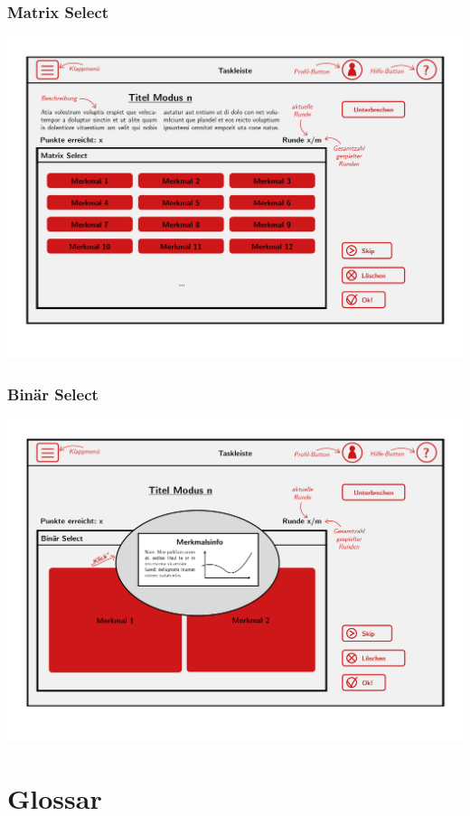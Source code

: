 \documentclass[a4paper]{scrreprt}
\begin{document}
    \subsection{Matrix Select}
    \centering
    \includegraphics[width=\textwidth]{../pictures/MatrixSelect.jpg}
    \subsection{Binär Select}
    \centering
    \includegraphics[width=\textwidth]{../pictures/BinSelect.jpg}

    \clearpage


    \chapter{Glossar}
    \printglossary
\end{document}

